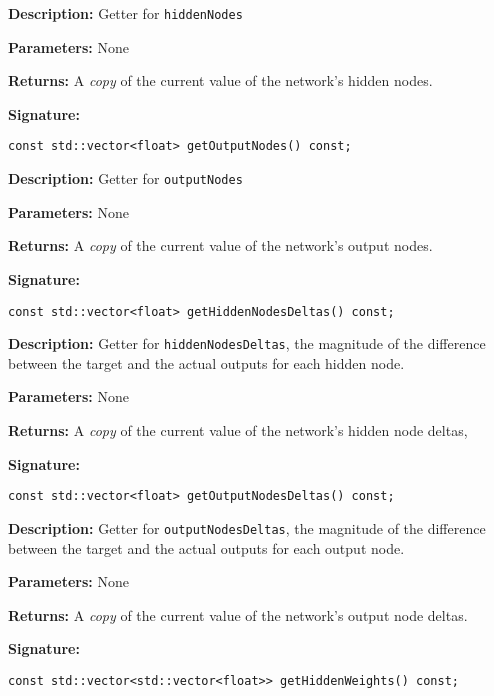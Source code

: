 \documentclass[a4paper]{article}
\begin{document}
\textbf{Description: }
Getter for \lstinline{hiddenNodes}

\textbf{Parameters: } None

\textbf{Returns: }
A \textit{copy} of the current value of the network's hidden nodes.
\hrulefill %

\textbf{Signature:} \begin{lstlisting}
const std::vector<float> getOutputNodes() const;
\end{lstlisting}

\textbf{Description: }
Getter for \lstinline{outputNodes}

\textbf{Parameters: } None

\textbf{Returns: }
A \textit{copy} of the current value of the network's output nodes.

\hrulefill %

\textbf{Signature:} \begin{lstlisting}
const std::vector<float> getHiddenNodesDeltas() const;
\end{lstlisting}

\textbf{Description: }
Getter for \lstinline{hiddenNodesDeltas}, the magnitude of the difference between the target and the actual outputs for each hidden node.

\textbf{Parameters: } None

\textbf{Returns: }
A \textit{copy} of the current value of the network's hidden node deltas,

\hrulefill %

\textbf{Signature:} \begin{lstlisting}
const std::vector<float> getOutputNodesDeltas() const;
\end{lstlisting}

\textbf{Description: }
Getter for \lstinline{outputNodesDeltas}, the magnitude of the difference between the target and the actual outputs for each output node.

\textbf{Parameters: } None

\textbf{Returns: }
A \textit{copy} of the current value of the network's output node deltas.

\hrulefill %

\textbf{Signature:} \begin{lstlisting}
const std::vector<std::vector<float>> getHiddenWeights() const;
\end{lstlisting}
\end{document}
